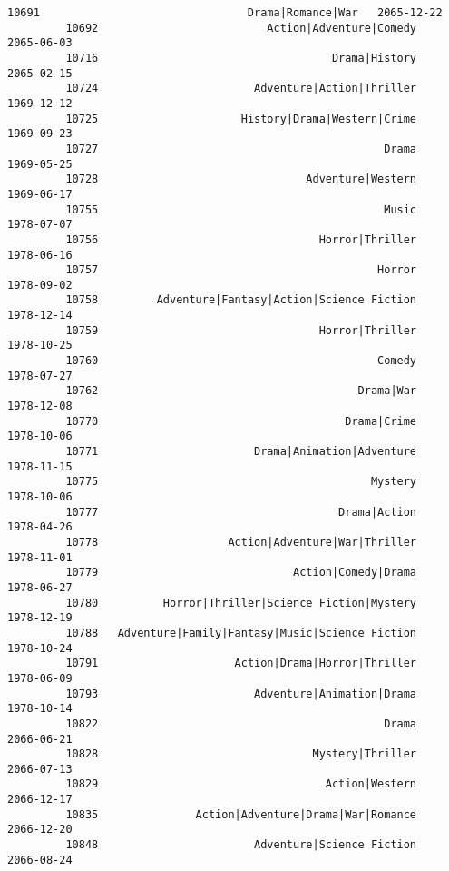 \documentclass[11pt]{article}
\begin{document}
\begin{Verbatim}[commandchars=\\\{\}]
         10691                                Drama|Romance|War   2065-12-22   
         10692                          Action|Adventure|Comedy   2065-06-03   
         10716                                    Drama|History   2065-02-15   
         10724                        Adventure|Action|Thriller   1969-12-12   
         10725                      History|Drama|Western|Crime   1969-09-23   
         10727                                            Drama   1969-05-25   
         10728                                Adventure|Western   1969-06-17   
         10755                                            Music   1978-07-07   
         10756                                  Horror|Thriller   1978-06-16   
         10757                                           Horror   1978-09-02   
         10758         Adventure|Fantasy|Action|Science Fiction   1978-12-14   
         10759                                  Horror|Thriller   1978-10-25   
         10760                                           Comedy   1978-07-27   
         10762                                        Drama|War   1978-12-08   
         10770                                      Drama|Crime   1978-10-06   
         10771                        Drama|Animation|Adventure   1978-11-15   
         10775                                          Mystery   1978-10-06   
         10777                                     Drama|Action   1978-04-26   
         10778                    Action|Adventure|War|Thriller   1978-11-01   
         10779                              Action|Comedy|Drama   1978-06-27   
         10780          Horror|Thriller|Science Fiction|Mystery   1978-12-19   
         10788   Adventure|Family|Fantasy|Music|Science Fiction   1978-10-24   
         10791                     Action|Drama|Horror|Thriller   1978-06-09   
         10793                        Adventure|Animation|Drama   1978-10-14   
         10822                                            Drama   2066-06-21   
         10828                                 Mystery|Thriller   2066-07-13   
         10829                                   Action|Western   2066-12-17   
         10835               Action|Adventure|Drama|War|Romance   2066-12-20   
         10848                        Adventure|Science Fiction   2066-08-24   
         

\end{Verbatim}
\end{document}
